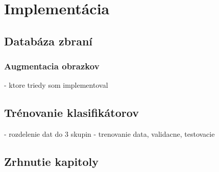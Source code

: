 
\chapter{Implementácia}



\section{Databáza zbraní}

\subsection{Augmentacia obrazkov}
- ktore triedy som implementoval


\section{Trénovanie klasifikátorov}
- rozdelenie dat do 3 skupin - trenovanie data, validacne, testovacie

\section{Zrhnutie kapitoly}

\begin{comment}

    \subsection{implementacia a vysledky- poznamky}
    \begin{enumerate}
        \item[$\bullet$] Z kade som realne cerpal data nakoniec
        \item[$\bullet$] Ako prebiehala augmentacia dat, opisat funkcie ktore sa pouzivaju pre dogenerovanie obrazkov a nazov tried ktore to implementuju.
        \item[$\bullet$] Obrazok trenovanie neuronovej siete
        \item[$\bullet$] Dosiahnute vysledky
        \item[$\bullet$] vytvorit velku prehladnu tabulku pre budu kompletne vysledky, tak ako to je na git-e opisane
    \end{enumerate}

\end{comment}
